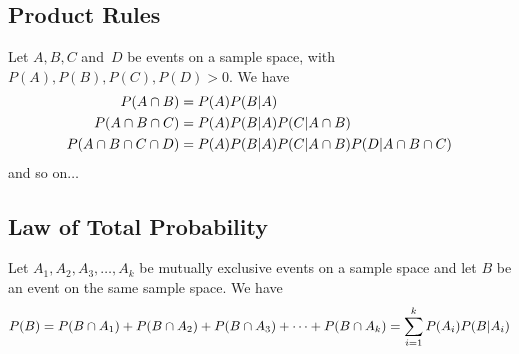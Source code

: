 \subsection*{Product Rules}
\begin{theorem}
Let $A, B, C$ and~$D$ be events on a sample space, with $P(A), P(B), P(C), P(D) > 0$. We have
\begin{align*}
    P(A \cap B) &= P(A)P(B \vert A) \\
    P(A \cap B \cap C) &= P(A)P(B \vert A)P(C \vert A \cap B) \\
    P(A \cap B \cap C \cap D) &=
    P(A)P(B \vert A)P(C \vert A \cap B)P(D \vert A \cap B \cap C) \\
\end{align*}
and so on$\ldots$
\end{theorem}
\subsection*{Law of Total Probability}
\begin{theorem}
Let $A_1, A_2, A_3,\ldots,A_k$ be mutually exclusive events on a sample space and let $B$ be an event on the same sample space. We have
\[
    P(B) = P(B \cap A_1) + P(B \cap A_2) + P(B \cap A_3) + \cdots + P(B \cap A_k)
    = \sum_{i = 1}^{k} P(A_i)P(B \vert A_i)
\]
\end{theorem}
